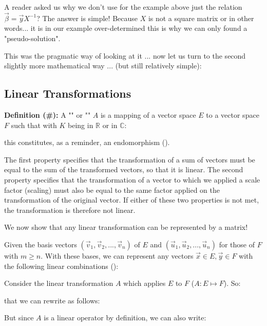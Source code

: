 	\begin{tcolorbox}[title=Remark,colframe=black,arc=10pt]
A reader asked us why we don't use for the example above just the relation $\vec{\beta}=\vec{y}X^{-1}$? The answer is simple! Because $X$ is not a square matrix or in other words... it is in our example over-determined this is why we can only found a "pseudo-solution".
	\end{tcolorbox}

This was the pragmatic way of looking at it ... now let us turn to the second slightly more mathematical way ... (but still relatively simple):

\subsection{Linear Transformations}
	
\textbf{Definition (\#\mydef):} A "" or "" $A$ is a mapping of a vector space $E$ to a vector space $F$ such that with $K$ being in $\mathbb{R}$ or in $\mathbb{C}$:
	
this constitutes, as a reminder, an endomorphism ().

The first property specifies that the transformation of a sum of vectors must be equal to the sum of the transformed vectors, so that it is linear. The second property specifies that the transformation of a vector to  which we applied a scale factor (scaling) must also be equal to the same factor applied on the transformation of the original vector. If either of these two properties is not met, the transformation is therefore not linear.

We now show that any linear transformation can be represented by a matrix!

Given the basis vectors $\left(\vec{v}_1,\vec{v}_2,...,\vec{v}_n \right)$ of $E$ and $\left(\vec{u}_1,\vec{u}_2,...,\vec{u}_n \right)$ for those of $F$ with $m \geq n$. With these bases, we can represent any vectors $\vec{x} \in E, \vec{y} \in F$ with the following linear combinations ():
	
	Consider the linear transformation $A$ which applies $E$ to $F$ ($A:E\mapsto F$). So:
			
	that we can rewrite as follows:
	
	But since $A$ is a linear operator by definition, we can also write:
	
